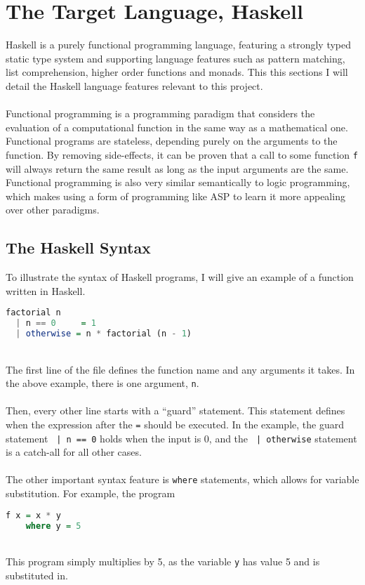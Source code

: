 \section{The Target Language, Haskell}
Haskell is a purely functional programming language, featuring a strongly typed static type system and supporting language features such as pattern matching, list comprehension, higher order functions and monads. This this sections I will detail the Haskell language features relevant to this project. \\ \\
Functional programming is a programming paradigm that considers the evaluation of a computational function in the same way as a mathematical one. Functional programs are stateless, depending purely on the arguments to the function. By removing side-effects, it can be proven that a call to some function \lstinline!f! will always return the same result as long as the input arguments are the same. Functional programming is also very similar semantically to logic programming, which makes using a form of programming like ASP to learn it more appealing over other paradigms.

\subsection{The Haskell Syntax}
To illustrate the syntax of Haskell programs, I will give an example of a function written in Haskell.

\begin{lstlisting}[language = Haskell]
factorial n
  | n == 0     = 1
  | otherwise = n * factorial (n - 1)
\end{lstlisting}
\mbox{} \\
The first line of the file defines the function name and any arguments it takes. In the above example, there is one argument, \lstinline!n!. \\ \\
Then, every other line starts with a ``guard'' statement. This statement defines when the expression after the \lstinline!=! should be executed. In the example, the guard statement \lstinline! | n == 0! holds when the input is 0, and the \lstinline! | otherwise! statement is a catch-all for all other cases. \\ \\
The other important syntax feature is \lstinline!where! statements, which allows for variable substitution. For example, the program \\

\begin{lstlisting}[language = Haskell]
f x = x * y
	where y = 5
\end{lstlisting}
\mbox{}\\
This program simply multiplies by 5, as the variable \lstinline!y! has value 5 and is substituted in.


%

\pagebreak